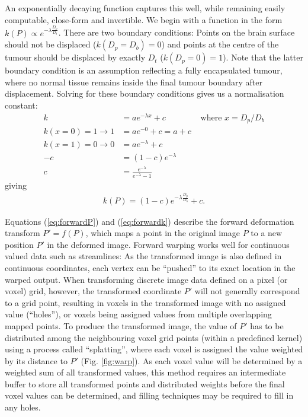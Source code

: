 An exponentially decaying function captures this well, while remaining easily computable, close-form and invertible.
We begin with a function in the form $k(P) \propto e^{-\lambda \frac{D_p}{D_t}}$.
There are two boundary conditions:
Points on the brain surface should not be displaced ($k(D_p = D_b) = 0$) and points at the centre of the tumour should be displaced by exactly $D_t$ ($k(D_p = 0) = 1$).
Note that the latter boundary condition is an assumption reflecting a fully encapsulated tumour, where no normal tissue remains inside the final tumour boundary after displacement.
Solving for these boundary conditions gives us a normalisation constant:
\begin{align}
  k &= a e^{-\lambda x} + c &\text{ where } x = D_p / D_b \nonumber \\
  k(x=0)=1 \longrightarrow 1 &= a e^{-0} + c = a + c \nonumber \\
  k(x=1)=0 \longrightarrow 0 &= a e^{-\lambda} + c \nonumber \\
  -c &= (1-c) e^{-\lambda} \nonumber \\
  c &= \frac{e^{-\lambda}}{e^{-\lambda} - 1} \label{eq:c}
\end{align}
giving
\begin{align}\label{eq:forwardk}
  k(P) = (1-c)e^{-\lambda \frac{D_p}{D_b}} +c.
\end{align}

Equations (\ref{eq:forwardP}) and (\ref{eq:forwardk}) describe the forward deformation transform $P'=f(P)$, which maps a point in the original image $P$ to a new position $P'$ in the deformed image.
Forward warping works well for continuous valued data such as streamlines:
As the transformed image is also defined in continuous coordinates, each vertex can be ``pushed'' to its exact location in the warped output.
When transforming discrete image data defined on a pixel (or voxel) grid, however, the transformed coordinate $P'$ will not generally correspond to a grid point, resulting in voxels in the transformed image with no assigned value (``holes''), or voxels being assigned values from multiple overlapping mapped points.
To produce the transformed image, the value of $P'$ has to be distributed among the neighbouring voxel grid points (within a predefined kernel) using a process called ``splatting''\autocite{Niklaus2020}, where each voxel is assigned the value weighted by its distance to $P'$ (Fig. \ref{fig:warp}).
As each voxel value will be determined by a weighted sum of all transformed values, this method requires an intermediate buffer to store all transformed points and distributed weights before the final voxel values can be determined, and filling techniques may be required to fill in any holes.

